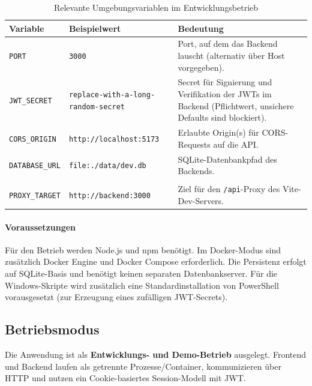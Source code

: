 \begin{table}[h]
\centering
\small
\setlength{\tabcolsep}{4pt}
\renewcommand{\arraystretch}{1.3}
\begin{tabularx}{\textwidth}{>{\raggedright\arraybackslash}p{3.1cm} >{\raggedright\arraybackslash}p{3.4cm} >{\raggedright\arraybackslash}X}
\toprule
\textbf{Variable} & \textbf{Beispielwert} & \textbf{Bedeutung} \\
\midrule
\texttt{PORT} & \texttt{3000} & Port, auf dem das Backend lauscht (alternativ über Host vorgegeben). \\
\texttt{JWT\_SECRET} & \texttt{replace-with-a-long-random-secret} & Secret für Signierung und Verifikation der JWTs im Backend (Pflichtwert, unsichere Defaults sind blockiert). \\
\texttt{CORS\_ORIGIN} & \texttt{http://localhost:5173} & Erlaubte Origin(s) für CORS-Requests auf die API. \\
\texttt{DATABASE\_URL} & \texttt{file:./data/dev.db} & SQLite-Datenbankpfad des Backends. \\
\shortstack[l]{\texttt{VITE\_API\_}\\\texttt{PROXY\_TARGET}} & \texttt{http://backend:3000} & Ziel für den \texttt{/api}-Proxy des Vite-Dev-Servers. \\
\bottomrule
\end{tabularx}
\caption{Relevante Umgebungsvariablen im Entwicklungsbetrieb}
\label{tab:betrieb-env}
\end{table}

\paragraph{Voraussetzungen}
Für den Betrieb werden Node.js und npm benötigt.
Im Docker-Modus sind zusätzlich Docker Engine und Docker Compose erforderlich.
Die Persistenz erfolgt auf SQLite-Basis und benötigt keinen separaten
Datenbankserver.
Für die Windows-Skripte wird zusätzlich eine Standardinstallation von
PowerShell vorausgesetzt (zur Erzeugung eines zufälligen JWT-Secrets).

\subsection{Betriebsmodus}

Die Anwendung ist als \textbf{Entwicklungs- und Demo-Betrieb} ausgelegt.
Frontend und Backend laufen als getrennte Prozesse/Container, kommunizieren
über HTTP und nutzen ein Cookie-basiertes Session-Modell mit JWT.


